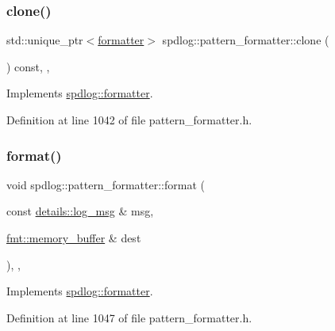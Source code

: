 \subsubsection{\texorpdfstring{clone()}{clone()}}
{\footnotesize\ttfamily std\+::unique\+\_\+ptr$<$\hyperlink{classspdlog_1_1formatter}{formatter}$>$ spdlog\+::pattern\+\_\+formatter\+::clone (\begin{DoxyParamCaption}{ }\end{DoxyParamCaption}) const\hspace{0.3cm}{\ttfamily [inline]}, {\ttfamily [override]}, {\ttfamily [virtual]}}



Implements \hyperlink{classspdlog_1_1formatter_ae9857a794904d98a4a9527a742e37129}{spdlog\+::formatter}.



Definition at line 1042 of file pattern\+\_\+formatter.\+h.

\mbox{\label{classspdlog_1_1pattern__formatter_ae43e84d7421ee7810b22ce1dc817ca3f}} 
\subsubsection{\texorpdfstring{format()}{format()}}
{\footnotesize\ttfamily void spdlog\+::pattern\+\_\+formatter\+::format (\begin{DoxyParamCaption}\item[{const \hyperlink{structspdlog_1_1details_1_1log__msg}{details\+::log\+\_\+msg} \&}]{msg,  }\item[{\hyperlink{format_8h_a21cbf729f69302f578e6db21c5e9e0d2}{fmt\+::memory\+\_\+buffer} \&}]{dest }\end{DoxyParamCaption})\hspace{0.3cm}{\ttfamily [inline]}, {\ttfamily [override]}, {\ttfamily [virtual]}}



Implements \hyperlink{classspdlog_1_1formatter_ad50e2b119d08fad952b0f885455b3bee}{spdlog\+::formatter}.



Definition at line 1047 of file pattern\+\_\+formatter.\+h.

